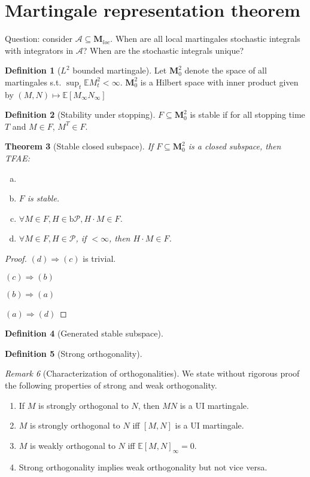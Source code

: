\documentclass[openany,oneside]{book}
\newtheorem{thm}{Theorem}[section]
\theoremstyle{definition}
\newtheorem{defn}[thm]{Definition}
\theoremstyle{remark}
\newtheorem{rem}[thm]{Remark}
\newcommand{\E}{\mathbb{E}} %
\newcommand{\pred}{\mathcal{P}} %
\newcommand{\bP}{\mathrm{b}\pred} %
\begin{document}
\section{Martingale representation theorem}
Question: consider $\mathcal{A} \subseteq \mathbf{M}_{loc}$. When are all local martingales stochastic integrals with integrators in $\mathcal{A}$? When are the stochastic integrals unique?

\begin{defn}[$L^2$ bounded martingale]
Let $\mathbf{M}^2_0$ denote the space of all martingales s.t. $\sup_t \E M^2_t < \infty$. $\mathbf{M}^2_0$ is a Hilbert space with inner product given by $(M,N) \mapsto \E[M_\infty N_\infty]$
\end{defn}

\begin{defn}[Stability under stopping]
$F\subseteq \mathbf{M}^2_0$ is stable if for all stopping time $T$ and $M\in F$, $M^T \in F$.
\end{defn}

\begin{thm}[Stable closed subspace]
If $F\subseteq \mathbf{M}^2_0$ is a closed subspace, then TFAE:
\begin{enumerate}[(a)]
\item 
\item $F$ is stable.
\item $\forall M\in F, H\in\bP, H\cdot M \in F$.
\item $\forall M\in F, H\in\pred$, if $<\infty$, then $H\cdot M \in F$. 
\end{enumerate}
\end{thm}

\begin{proof}
$(d)\Rightarrow (c)$ is trivial.
\par
$(c)\Rightarrow (b)$
\par
$(b)\Rightarrow (a)$
\par
$(a)\Rightarrow (d)$

\end{proof}

\begin{defn}[Generated stable subspace]

\end{defn}

\begin{defn}[Strong orthogonality]

\end{defn}
\begin{rem}[Characterization of orthogonalities]
We state without rigorous proof the following properties of strong and weak orthogonality. 
\begin{enumerate}
\item If $M$ is strongly orthogonal to $N$, then $MN$ is a UI martingale.
\item $M$ is strongly orthogonal to $N$ iff $[M,N]$ is a UI martingale.
\item $M$ is weakly orthogonal to $N$ iff $\E[M,N]_\infty =0$.
\item Strong orthogonality implies weak orthogonality but not vice versa.
\end{enumerate}
\end{rem}
\end{document}
